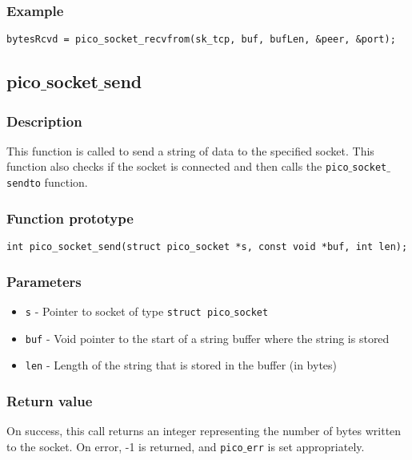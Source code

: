 \subsubsection*{Example}
\begin{verbatim}
bytesRcvd = pico_socket_recvfrom(sk_tcp, buf, bufLen, &peer, &port);
\end{verbatim}


\subsection{pico$\_$socket$\_$send}

\subsubsection*{Description}
This function is called to send a string of data to the specified socket.
This function also checks if the socket is connected and then calls the
\texttt{pico$\_$socket$\_$sendto} function.

\subsubsection*{Function prototype}
\begin{verbatim}
int pico_socket_send(struct pico_socket *s, const void *buf, int len);
\end{verbatim}


\subsubsection*{Parameters}
\begin{itemize}[noitemsep]
\item \texttt{s} - Pointer to socket of type \texttt{struct pico$\_$socket}
\item \texttt{buf} - Void pointer to the start of a string buffer where the string is stored
\item \texttt{len} - Length of the string that is stored in the buffer (in bytes)
\end{itemize}

\subsubsection*{Return value}
On success, this call returns an integer representing the number of bytes written to
the socket. On error, -1 is returned, and \texttt{pico$\_$err} is set appropriately.

